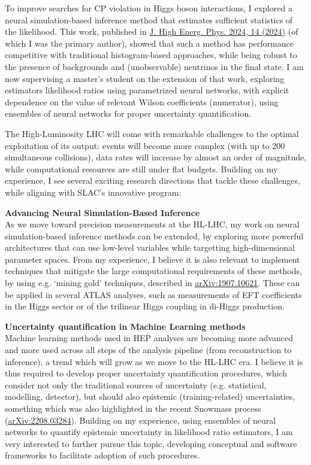 \documentclass[11pt, a4paper]{awesome-cv}
\begin{document}
\begin{cvletter}
To improve searches for CP violation in Higgs boson interactions, I explored a neural simulation-based inference method that estimates sufficient statistics of the likelihood. This work, published in \href{https://doi.org/10.1007/JHEP04(2024)014}{J. High Energ. Phys. 2024, 14 (2024)} (of which I was the primary author), showed that such a method has performance competitive with traditional histogram-based approaches, while being robust to the presence of backgrounds and (unobservable) neutrinos in the final state. I am now supervising a master's student on the extension of that work, exploring estimators likelihood ratios using parametrized neural networks, with explicit dependence on the value of relevant Wilson coefficients (numerator), using ensembles of neural networks for proper uncertainty quantification.


The High-Luminosity LHC will come with remarkable challenges to the optimal exploitation of its output: events will become more complex (with up to 200 simultaneous collisions), data rates will increase by almost an order of magnitude, while computational resources are still under flat budgets. Building on my experience, I see several exciting research directions that tackle these challenges, while aligning with SLAC's innovative program:

\textbf{Advancing Neural Simulation-Based Inference}\\
As we move toward precision measurements at the HL-LHC, my work on neural simulation-based inference methods can be extended, by exploring more powerful architectures that can use low-level variables while targetting high-dimensional parameter spaces. From my experience, I believe it is also relevant to implement techniques that mitigate the large computational requirements of these methods, by using e.g. `mining gold' techniques, described in \href{https://arxiv.org/abs/1907.10621}{arXiv:1907.10621}. These can be applied in several ATLAS analyses, such as measurements of EFT coefficients in the Higgs sector or of the trilinear Higgs coupling in di-Higgs production.

\textbf{Uncertainty quantification in Machine Learning methods}\\
Machine learning methods used in HEP analyses are becoming more advanced and more used across all steps of the analysis pipeline (from reconstruction to inference), a trend which will grow as we move to the HL-LHC era. I believe it is thus required to develop proper uncertainty quantification procedures, which consider not only the traditional sources of uncertainty (e.g. statistical, modelling, detector), but should also epistemic (training-related) uncertainties, something which was also highlighted in the recent Snowmass process (\href{https://arxiv.org/abs/2208.03284}{arXiv:2208.03284}). Building on my experience, using ensembles of neural networks to quantify epistemic uncertainty in likelihood ratio estimators, I am very interested to further pursue this topic, developing conceptual and software frameworks to facilitate adoption of such procedures.


\end{cvletter}
\end{document}
